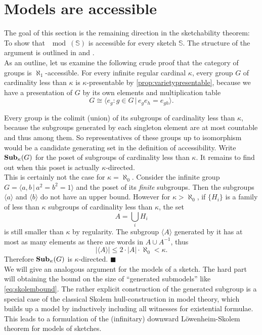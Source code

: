 \section{Models are accessible}
\label{sec:sketchesaccessible}

The goal of this section is the remaining direction in the sketchability theorem: To show that $\mod(\mathbb S)$ is accessible for every sketch $\mathbb S$. The structure of the argument is outlined in \cite[\nopp~3.3.5]{MakkaiPare} and \cite[D2.3.11]{elephant}. \\

As an outline, let us examine the following crude proof that the category of groups is $\aleph_1$-accessible. For every infinite regular cardinal $\kappa$, every group $G$ of cardinality less than $\kappa$ is $\kappa$-presentable by \ref{prop:varietypresentable}, because we have a presentation of $G$ by its own elements and multiplication table
\[ G \cong \langle e_g : g \in G \,|\, e_g e_h = e_{gh} \rangle. \]

Every group is the colimit (union) of its subgroups of cardinality less than $\kappa$, because the subgroups generated by each singleton element are at most countable and thus among them. So representatives of these groups up to isomorphism would be a candidate generating set in the definition of accessibility. Write $\mathbf{Sub}_\kappa(G)$ for the poset of subgroups of cardinality less than $\kappa$. It remains to find out when this poset is actually $\kappa$-directed. \\

This is certainly not the case for $\kappa=\aleph_0$. Consider the infinite group $G=\langle a, b \,|\, a^2 = b^2 = 1 \rangle$ and the poset of its \emph{finite} subgroups. Then the subgroups $\langle a \rangle$ and $\langle b \rangle$ do not have an upper bound. 
However for $\kappa > \aleph_0$, if $\{H_i\}$ is a family of less than $\kappa$ subgroups of cardinality less than $\kappa$, the set \[ A = \bigcup_i H_i \]
is still smaller than $\kappa$ by regularity. The subgroup $\langle A \rangle$ generated by it has at most as many elements as there are words in $A \cup A^{-1}$, thus
\begin{equation} |\langle A \rangle| \leq 2 \cdot |A|\cdot \aleph_0 < \kappa. \label{eq:skolembound} \end{equation}
Therefore $\mathbf{Sub}_\kappa(G)$ is $\kappa$-directed. $\blacksquare$ \\

We will give an analogous argument for the models of a sketch. The hard part will obtaining the bound on the size of ``generated submodels'' like \eqref{eq:skolembound}. The rather explicit construction of the generated subgroup is a special case of the classical Skolem hull-construction in model theory, which builds up a model by inductively including all witnesses for existential formulae. This leads to a formulation of the (infinitary) downward Löwenheim-Skolem theorem for models of sketches. \\

